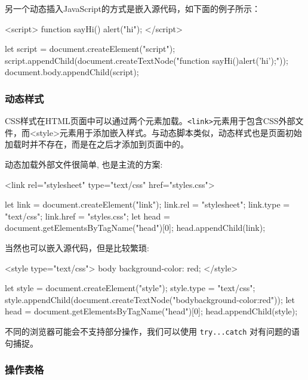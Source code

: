 另一个动态插入JavaScript的方式是嵌入源代码，如下面的例子所示：
\begin{HTML}
<script>    
    function sayHi() {     
        alert("hi");  
    } 
</script> 
\end{HTML}

\begin{JavaScript}
let script = document.createElement("script"); 
script.appendChild(document.createTextNode("function sayHi(){alert('hi');}")); 
document.body.appendChild(script); 
\end{JavaScript}

\subsubsection*{动态样式}

CSS样式在HTML页面中可以通过两个元素加载。\texttt{<link>}元素用于包含CSS外部文件，而<style>元素用于添加嵌入样式。与动态脚本类似，动态样式也是页面初始加载时并不存在，而是在之后才添加到页面中的。

动态加载外部文件很简单, 也是主流的方案:

\begin{HTML}
<link rel="stylesheet" type="text/css" href="styles.css">
\end{HTML}

\begin{JavaScript}
let link = document.createElement("link"); 
link.rel = "stylesheet"; 
link.type = "text/css"; 
link.href = "styles.css"; 
let head = document.getElementsByTagName("head")[0]; 
head.appendChild(link); 
\end{JavaScript}

当然也可以嵌入源代码，但是比较繁琐:

\begin{HTML}
<style type="text/css"> 
body {   
    background-color: red; 
} 
</style> 
\end{HTML}

\begin{JavaScript}
let style = document.createElement("style"); 
style.type = "text/css"; 
style.appendChild(document.createTextNode("body{background-color:red}")); 
let head = document.getElementsByTagName("head")[0]; 
head.appendChild(style); 
\end{JavaScript}

不同的浏览器可能会不支持部分操作，我们可以使用 \texttt{try...catch} 对有问题的语句捕捉。

\subsubsection*{操作表格}

